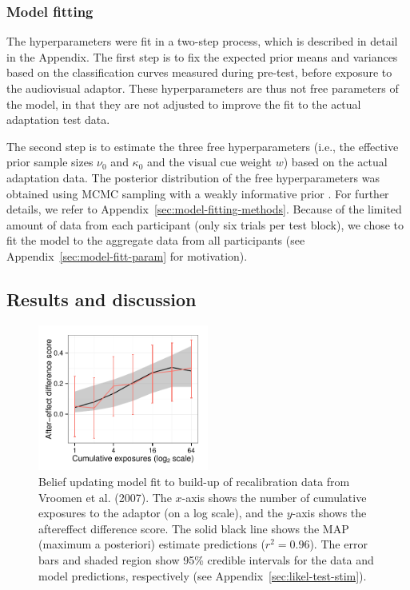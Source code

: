 \subsubsection{Model fitting}
\label{sec:free-parameters}

The hyperparameters were fit in a two-step process, which is described in detail in the Appendix.  %
The first step is to fix the expected prior means and variances based on the classification curves measured during pre-test, before exposure to the audiovisual adaptor.  These hyperparameters are thus not free parameters of the model, in that they are not adjusted to improve the fit to the actual adaptation test data.

The second step is to estimate the three free hyperparameters (i.e., the effective prior sample sizes $\nu_0$ and $\kappa_0$ and the visual cue weight $w$) based on the actual adaptation data. The posterior distribution of the free hyperparameters was obtained using MCMC sampling with a weakly informative prior \autocite[to ensure a proper posterior,][]{Gelman2003}. For further details, we refer to Appendix~\ref{sec:model-fitting-methods}.
Because of the limited amount of data from each participant (only six trials per test block), we chose to fit the model to the aggregate data from all participants (see Appendix~\ref{sec:model-fitt-param} for motivation).

\subsection{Results and discussion}
\label{sec:results}

\begin{figure}[htb]
  \centering
  \includegraphics[width=0.5\textwidth]{figure/vroomen-recal-ae-fits-first-64.pdf}
  \caption{Belief updating model fit to build-up of recalibration data from Vroomen et al. (2007).  The $x$-axis shows the number of cumulative exposures to the adaptor (on a log scale), and the $y$-axis shows the aftereffect difference score.  The solid black line shows the MAP (maximum a posteriori) estimate predictions ($r^2=0.96$). The error bars and shaded region show 95\% credible intervals for the data and model predictions, respectively (see Appendix~\ref{sec:likel-test-stim}). }
  \label{fig:recal-buildup-preds}
\end{figure}

